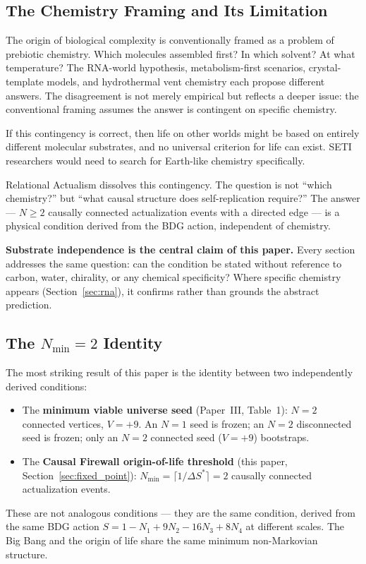 \documentclass[12pt,a4paper]{article}
\begin{document}
\subsection{The Chemistry Framing and Its Limitation}

The origin of biological complexity is conventionally framed as a problem of prebiotic chemistry.  Which molecules assembled first?  In which solvent?  At what temperature?  The RNA-world hypothesis, metabolism-first scenarios, crystal-template models, and hydrothermal vent chemistry each propose different answers.  The disagreement is not merely empirical but reflects a deeper issue: the conventional framing assumes the answer is contingent on specific chemistry.

If this contingency is correct, then life on other worlds might be based on entirely different molecular substrates, and no universal criterion for life can exist.  SETI researchers would need to search for Earth-like chemistry specifically.

Relational Actualism dissolves this contingency.  The question is not ``which chemistry?'' but ``what causal structure does self-replication require?''  The answer --- $N\geq2$ causally connected actualization events with a directed edge --- is a physical condition derived from the BDG action, independent of chemistry.

\textbf{Substrate independence is the central claim of this paper.}  Every section addresses the same question: can the condition be stated without reference to carbon, water, chirality, or any chemical specificity?  Where specific chemistry appears (Section~\ref{sec:rna}), it confirms rather than grounds the abstract prediction.

\subsection{The $N_{\min}=2$ Identity}

The most striking result of this paper is the identity between two independently derived conditions:
\begin{itemize}
  \item The \textbf{minimum viable universe seed} (Paper~III, Table~1): $N=2$ connected vertices, $V=+9$.  An $N=1$ seed is frozen; an $N=2$ disconnected seed is frozen; only an $N=2$ connected seed ($V=+9$) bootstraps.
  \item The \textbf{Causal Firewall origin-of-life threshold} (this paper, Section~\ref{sec:fixed_point}): $N_{\min}=\lceil1/\Delta S^*\rceil=2$ causally connected actualization events.
\end{itemize}
These are not analogous conditions --- they are the same condition, derived from the same BDG action $S=1-N_1+9N_2-16N_3+8N_4$ at different scales.  The Big Bang and the origin of life share the same minimum non-Markovian structure.
\end{document}
